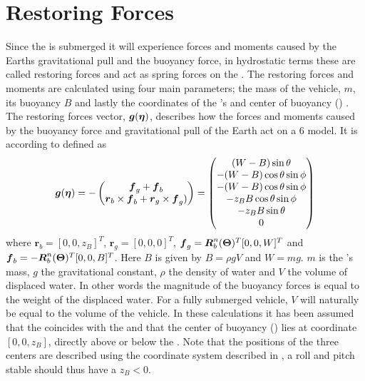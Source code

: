 \section{Restoring Forces}
Since the \abbrROV is submerged it will experience forces and moments caused by the Earths gravitational pull and the buoyancy force, in hydrostatic terms these are called restoring forces and act as spring forces on the \abbrROV \citep{fossen2011}. The restoring forces and moments are calculated using four main parameters; the mass of the vehicle, $m$, its buoyancy $B$ and lastly the coordinates of the \abbrROV's \abbrCG and center of buoyancy (\abbrCB) \citep{fossen2011}. The restoring forces vector, $\boldsymbol{g}(\boldsymbol{\eta})$, describes how the forces and moments caused by the buoyancy force and gravitational pull of the Earth act on a 6 \abbrDOF model. It is according to \citet[p.60]{fossen2011} defined as
\begin{equation} \label{eq:restoring_forces}
    \boldsymbol{g}(\boldsymbol{\eta}) = -
     \begin{pmatrix}
    \boldsymbol{f}_g + \boldsymbol{f}_b \\
    \boldsymbol{r}_b \times \boldsymbol{f}_b + \boldsymbol{r}_g \times \boldsymbol{f}_g) 
     \end{pmatrix} 
     =
    \begin{pmatrix}
        (W - B) \sin \theta\\
    -(W - B) \cos \theta \sin \phi\\
    -(W - B) \cos \theta \sin \phi\\
    -z_B B \cos \theta \sin \phi\\
    -z_B B \sin \theta\\
    0\\
    \end{pmatrix}
\end{equation}
where $\boldsymbol{r}_b = [0, 0, z_B]^T$, $\boldsymbol{r}_g = [0, 0, 0]^T$, $\boldsymbol{f}_g = \boldsymbol{R}^n_b(\boldsymbol{\Theta})^T [0, 0, W]^T$ and $\boldsymbol{f}_b = -\boldsymbol{R}^n_b(\boldsymbol{\Theta})^T [0, 0, B]^T$.
Here $B$ is given by $B = \rho g V$ and $W = m g$. $m$ is the \abbrROV's mass, $g$ the gravitational constant, $\rho$ the density of water and $V$ the volume of displaced water. In other words the magnitude of the buoyancy forces is equal to the weight of the displaced water. For a fully submerged vehicle, $V$ will naturally be equal to the volume of the vehicle.
In these calculations it has been assumed that the \abbrCG coincides with the \abbrCO and that the center of buoyancy (\abbrCB) lies at coordinate $[0, 0, z_B]$, directly above or below the \abbrCO. Note that the positions of the three centers are described using the coordinate system described in , a roll and pitch stable \abbrROV should thus have a $z_B < 0$.

